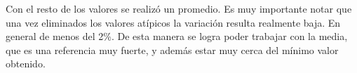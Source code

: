 	Con el resto de los valores se realizó un promedio. Es muy importante notar que una vez eliminados los valores
atípicos la variación resulta realmente baja. En general de menos del 2\%. De esta manera se logra poder trabajar
con la media, que es una referencia muy fuerte, y además estar muy cerca del mínimo valor obtenido.

	

	

